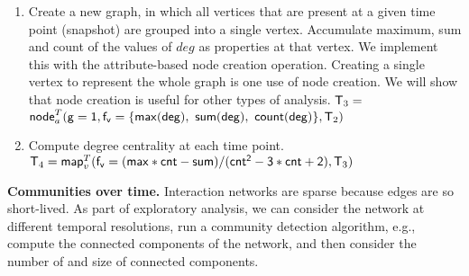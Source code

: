 \begin{enumerate}[noitemsep,,itemindent=\dimexpr\labelwidth+\labelsep\relax,leftmargin=0pt]
\item Create a new graph, in which all vertices that are present at a
  given time point (snapshot) are grouped into a single vertex.
  Accumulate maximum, sum and count of the values of $deg$ as
  properties at that vertex.  We implement this with the
  attribute-based node creation operation.  Creating a single vertex
  to represent the whole graph is one use of node creation.  We will
  show that node creation is useful for other types of analysis. $\mathsf{T}_3 =$\\
  $\textsf{node}^T_a(\mathsf{g=1,f_v=\{max(deg),~sum(deg),~count(deg)\}},\mathsf{T}_2)$

\item Compute degree centrality at each time point.\\
$\mathsf{T}_4 = \textsf{map}^T_v(\mathsf{f_v=(max*cnt-sum)/(cnt^2-3*cnt+2)}, \mathsf{T}_3)$

\end{enumerate}

{\bf Communities over time.} Interaction networks are sparse because
edges are so short-lived.  As part of exploratory analysis, we can
consider the network at different temporal resolutions, run a
community detection algorithm, e.g., compute the connected components
of the network, and then consider the number of and size of connected
components.

